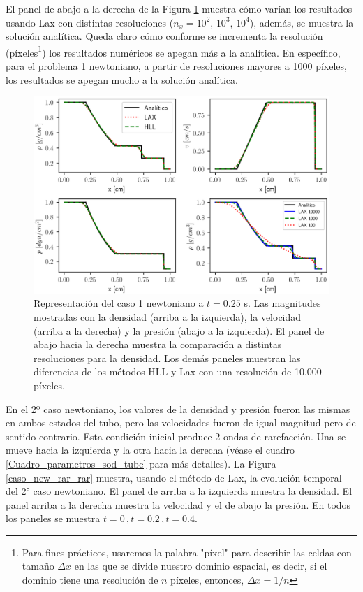 \documentclass[12pt,a4paper]{book}
\begin{document}
El panel de abajo a la derecha de la Figura 
\ref{comparacion_analitico_newtoniano_caso_1} muestra cómo varían los resultados
usando Lax con distintas resoluciones ($n_x = 10^2, \, 10^3, \,10^4$), además, se muestra la solución
analítica.
Queda claro cómo 
conforme se incrementa la resolución (píxeles\footnote{Para fines prácticos, usaremos la palabra "píxel" para describir las celdas con tamaño $\Delta x$ en 
las que se divide nuestro dominio espacial, es decir, si el dominio tiene una resolución de $n$ 
píxeles, entonces, $\Delta x = 1/n$ }) los resultados numéricos se apegan más a la analítica. 
En específico, para el problema 1 newtoniano, a partir de resoluciones mayores a 1000 píxeles,
los resultados 
se apegan mucho a la solución analítica.

\begin{figure}
  \centering
    \includegraphics[width=1.0\textwidth]{./Figuras/verificacion_del_codigo/rarefaction.png}
  \caption{Representación del caso 1 newtoniano a $t = 0.25$ s. Las magnitudes mostradas con
  la densidad (arriba a la izquierda), la velocidad (arriba a la derecha) y la presión (abajo a la 
  izquierda).
  El panel de abajo hacia la derecha muestra la comparación a distintas resoluciones para la densidad. Los demás paneles muestran
  las diferencias de los métodos HLL y Lax con una resolución de 10,000 píxeles.
  \label{comparacion_analitico_newtoniano_caso_1}}
\end{figure}

En el 2º caso newtoniano, los valores de la densidad y presión fueron las mismas en ambos estados del tubo, pero las velocidades fueron de igual magnitud
pero de sentido contrario. Esta condición inicial produce 2 ondas de rarefacción. Una se mueve hacia
la izquierda y la otra hacia la derecha (véase el cuadro \ref{Cuadro_parametros_sod_tube} para más
detalles).
La Figura \ref{caso_new_rar_rar} muestra, usando
el método de Lax, la evolución temporal del 2° caso newtoniano. El panel de arriba a la izquierda muestra la densidad.
El panel arriba a la derecha muestra la velocidad y el de abajo la presión. En todos los paneles se 
muestra $t = 0 \, , t = 0.2 \, ,t = 0.4$.
\end{document}
